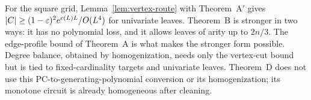 \begin{remark}
For the square grid, Lemma~\ref{lem:vertex-route} with Theorem~A$'$ gives $\lvert C\rvert\ge(1-\varepsilon)^2e^{c(L)L}/O(L^4)$ for univariate leaves. Theorem~B is stronger in two ways: it has no polynomial loss, and it allows leaves of arity up to $2n/3$. The edge-profile bound of Theorem~A is what makes the stronger form possible. Degree balance, obtained by homogenization, needs only the vertex-cut bound but is tied to fixed-cardinality targets and univariate leaves. Theorem~D does not use this PC-to-generating-polynomial conversion or its homogenization; its monotone circuit is already homogeneous after cleaning.
\end{remark}
